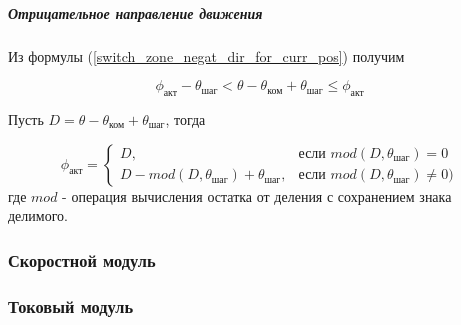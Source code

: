 \subparagraph{Отрицательное направление движения}
Из формулы (\ref{switch_zone_negat_dir_for_curr_pos}) получим

\begin{equation}
    \label{sync_restore_negat_dir_active_pole_pos_conditions}
    \phi_\textit{акт} - \theta_\textit{шаг}
    < \theta - \theta_\textit{ком} + \theta_\textit{шаг}
    \leq \phi_\textit{акт}
\end{equation}

Пусть $D = \theta - \theta_\textit{ком} + \theta_\textit{шаг}$, тогда

\begin{equation}
    \label{sync_restore_negat_dir_active_pole_pos}
    \phi_\textit{акт} =
        \begin{cases}
            D,                                                      & \mbox{если } mod(D, \theta_\textit{шаг}) = 0 \\
            D - mod(D, \theta_\textit{шаг}) + \theta_\textit{шаг},  & \mbox{если } mod(D, \theta_\textit{шаг}) \ne 0)
        \end{cases}
\end{equation}
где $mod$ - операция вычисления остатка от деления с сохранением знака делимого.

\subsubsection{Скоростной модуль}
\subsubsection{Токовый модуль}
